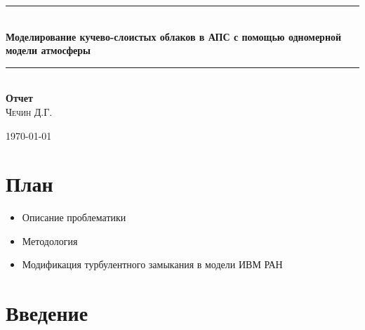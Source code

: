 \documentclass[12pt]{article}
\begin{document}
\begin{titlepage}
\begin{center}
\hrule~\\[0.4cm]
{\bf \Large Моделирование кучево-слоистых облаков в АПС с помощью одномерной модели атмосферы }\\[1cm]
\hrule~ \\[0.4cm]
{\bf \large Отчет }\\[1cm]


\textsc{Чечин} Д.Г. \\

\vfill

{\large \today} 
\end{center}
\end{titlepage}

\begin{center}
{\bf }
\end{center}

\section{План}
\begin{itemize}
\item{Описание проблематики}
\item{Методология}
\item{Модификация турбулентного замыкания в модели ИВМ РАН}
\end{itemize}

\section{Введение}
\end{document}
